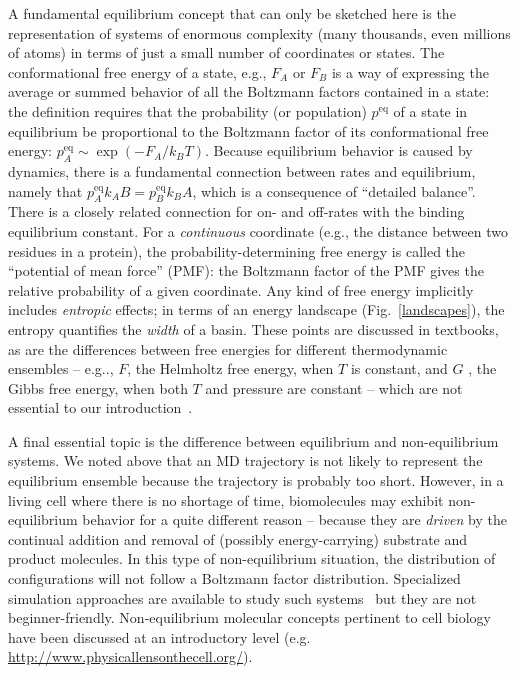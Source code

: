 \documentclass[9pt,bestpractices]{livecoms}
\newcommand{\peq}{p^{\mathrm{eq}}}
\begin{document}
A fundamental equilibrium concept that can only be sketched here is the representation of systems of enormous complexity (many thousands, even millions of atoms) in terms of just a small number of coordinates or states.  
The conformational free energy of a state, e.g., $F_A$ or $F_B$ is a way of expressing the average or summed behavior of all the Boltzmann factors contained in a state: the definition requires that the probability (or population) $\peq$ of a state in equilibrium be proportional to the Boltzmann factor of its conformational free energy: $\peq_A \sim \exp(-F_A/k_BT)$.  
Because equilibrium behavior is caused by dynamics, there is a fundamental connection between rates and equilibrium, namely that $\peq_A k_AB = \peq_B k_BA$, which is a consequence of ``detailed balance''.
There is a closely related connection for on- and off-rates with the binding equilibrium constant.  
For a \emph{continuous} coordinate (e.g., the distance between two residues in a protein), the probability-determining free energy is called the “potential of mean force” (PMF): the Boltzmann factor of the PMF gives the relative probability of a given coordinate.  
Any kind of free energy implicitly includes \emph{entropic} effects; in terms of an energy landscape (Fig.\ \ref{landscapes}), the entropy quantifies the \emph{width} of a basin.  
These points are discussed in textbooks, as are the differences between free energies for different thermodynamic ensembles -- e.g.., $F$, the Helmholtz free energy, when $T$ is constant, and $G$ , the Gibbs free energy, when both $T$ and pressure are constant -- which are not essential to our introduction~\cite{DillBook, Zuckerman:2010:}.

A final essential topic is the difference between equilibrium and non-equilibrium systems.  
We noted above that an MD trajectory is not likely to represent the equilibrium ensemble because the trajectory is probably too short.  
However, in a living cell where there is no shortage of time, biomolecules may exhibit non-equilibrium behavior for a quite different reason -- because they are \emph{driven} by the continual addition and removal of (possibly energy-carrying) substrate and product molecules.  
In this type of non-equilibrium situation, the distribution of configurations will not follow a Boltzmann factor distribution.  
Specialized simulation approaches are available to study such systems~\cite{Chong:2017:CurrentOpinioninStructuralBiology,  Zuckerman:2017:Annu.Rev.Biophys.} but they are not beginner-friendly.  
Non-equilibrium molecular concepts pertinent to cell biology have been discussed at an introductory level (e.g. \url{http://www.physicallensonthecell.org/}).
\end{document}
